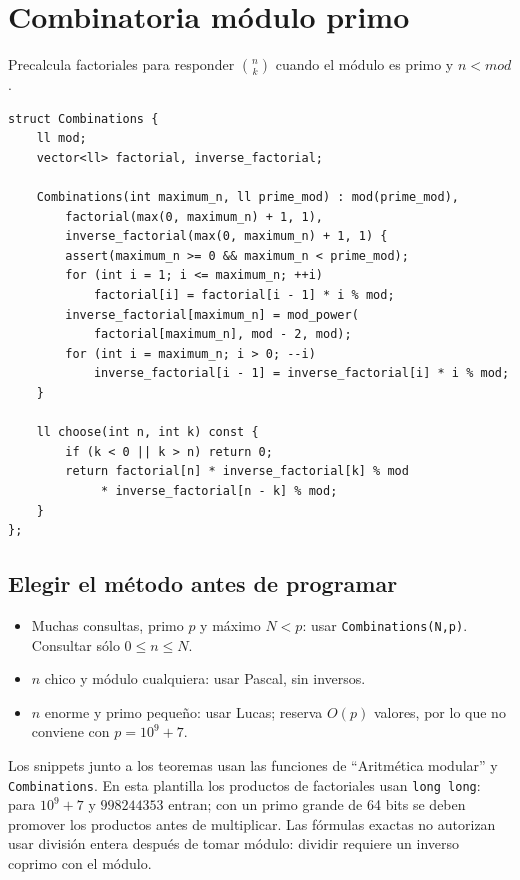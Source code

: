 \section{Combinatoria m\'odulo primo}

Precalcula factoriales para responder $\binom nk$ cuando el m\'odulo es primo
y $n<mod$.

\begin{lstlisting}[style=cpp]
struct Combinations {
    ll mod;
    vector<ll> factorial, inverse_factorial;

    Combinations(int maximum_n, ll prime_mod) : mod(prime_mod),
        factorial(max(0, maximum_n) + 1, 1),
        inverse_factorial(max(0, maximum_n) + 1, 1) {
        assert(maximum_n >= 0 && maximum_n < prime_mod);
        for (int i = 1; i <= maximum_n; ++i)
            factorial[i] = factorial[i - 1] * i % mod;
        inverse_factorial[maximum_n] = mod_power(
            factorial[maximum_n], mod - 2, mod);
        for (int i = maximum_n; i > 0; --i)
            inverse_factorial[i - 1] = inverse_factorial[i] * i % mod;
    }

    ll choose(int n, int k) const {
        if (k < 0 || k > n) return 0;
        return factorial[n] * inverse_factorial[k] % mod
             * inverse_factorial[n - k] % mod;
    }
};
\end{lstlisting}


\subsection{Elegir el m\'etodo antes de programar}
\begin{itemize}
  \item Muchas consultas, primo $p$ y m\'aximo $N<p$: usar
  \texttt{Combinations(N,p)}. Consultar s\'olo $0\le n\le N$.
  \item $n$ chico y m\'odulo cualquiera: usar Pascal, sin inversos.
  \item $n$ enorme y primo peque\~no: usar Lucas; reserva $O(p)$ valores,
  por lo que no conviene con $p=10^9+7$.
\end{itemize}

Los snippets junto a los teoremas usan las funciones de ``Aritm\'etica modular'' y
\texttt{Combinations}. En esta plantilla los productos de factoriales usan
\texttt{long long}: para $10^9+7$ y $998244353$ entran; con un primo grande
de 64 bits se deben promover los productos antes de multiplicar.
Las f\'ormulas exactas no autorizan usar divisi\'on entera despu\'es de tomar
m\'odulo: dividir requiere un inverso coprimo con el m\'odulo.
